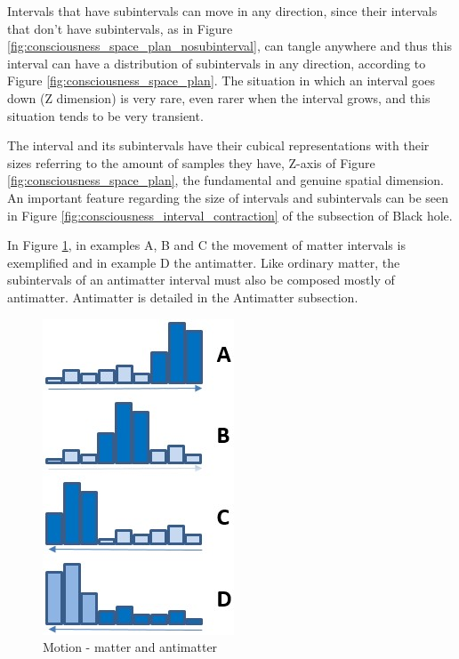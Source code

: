 Intervals that have subintervals can move in any direction, since their intervals that don't have subintervals, as in Figure \ref{fig:consciousness_space_plan_nosubinterval}, can tangle anywhere and thus this interval can have a distribution of subintervals in any direction, according to Figure \ref{fig:consciousness_space_plan}. The situation in which an interval goes down (Z dimension) is very rare, even rarer when the interval grows, and this situation tends to be very transient.

The interval and its subintervals have their cubical representations with their sizes referring to the amount of samples they have, Z-axis of Figure \ref{fig:consciousness_space_plan}, the fundamental and genuine spatial dimension. An important feature regarding the size of intervals and subintervals can be seen in Figure \ref{fig:consciousness_interval_contraction} of the subsection of Black hole.

In Figure \ref{fig:consciousness_space_matter_antimatter}, in examples A, B and C the movement of matter intervals is exemplified and in example D the antimatter. Like ordinary matter, the subintervals of an antimatter interval must also be composed mostly of antimatter. Antimatter is detailed in the Antimatter subsection.
	\begin{figure}[H]
	\caption{Motion - matter and antimatter}
	\label{fig:consciousness_space_matter_antimatter}
	\centering
	\includegraphics[scale=.7]{sections/images/consciousness_space_matter_antimatter.jpg}
	\end{figure}

